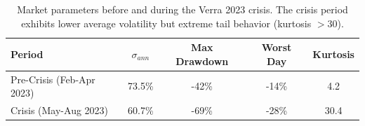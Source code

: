 \begin{table}[t]
\centering
\footnotesize
\caption{Market parameters before and during the Verra 2023 crisis. The crisis period exhibits lower average volatility but extreme tail behavior (kurtosis $>30$).}
\label{tab:crisis_params}
\begin{tabular}{lcccc}
\hline
Period & $\sigma_{ann}$ & Max Drawdown & Worst Day & Kurtosis \\
\hline
Pre-Crisis (Feb-Apr 2023) & 73.5\% & -42\% & -14\% & 4.2 \\
Crisis (May-Aug 2023) & 60.7\% & -69\% & -28\% & 30.4 \\
\hline
\end{tabular}
\end{table}
